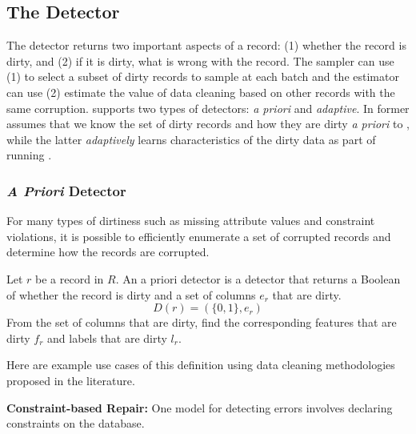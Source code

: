 \subsection{The Detector}\label{det}

The detector returns two important aspects of a record: 
(1) whether the record is dirty, and (2) if it is dirty, what is wrong with the record.
The sampler can use (1) to select a subset of dirty records to sample at each batch and 
the estimator can use (2) estimate the value of data cleaning based on other records with the same corruption.
\sys supports two types of detectors: \emph{a priori} and \emph{adaptive}.
In former assumes that we know the set of dirty records and how they are dirty \emph{a priori} to \sys,
while the latter \emph{adaptively} learns characteristics of the dirty data as part of running \sys.

\subsubsection{\protect\textit{\large A Priori} Detector}
For many types of dirtiness such as missing attribute values and constraint violations, 
it is possible to efficiently enumerate a set of corrupted records and determine how the records are corrupted.

\begin{definition}
Let $r$ be a record in $R$. An a priori detector is a detector that returns a Boolean of whether the record is dirty and a set of columns $e_r$ that are dirty.
\[
D(r) = (\{0,1\}, e_r)
\]
From the set of columns that are dirty, find the corresponding features that are dirty $f_r$ and labels that are dirty $l_r$.
\end{definition}

\noindent Here are example use cases of this definition using data cleaning methodologies proposed in the literature.

\vspace{0.5em}

\noindent\textbf{Constraint-based Repair: }
One model for detecting errors involves declaring constraints on the database.

